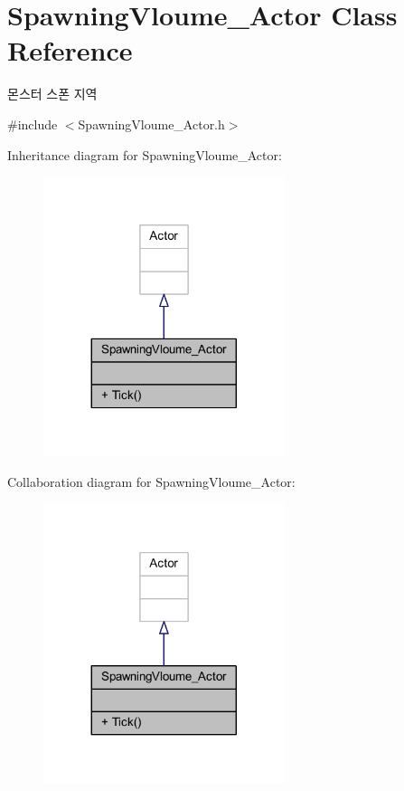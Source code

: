 \hypertarget{class_spawning_vloume___actor}{}\section{Spawning\+Vloume\+\_\+\+Actor Class Reference}
\label{class_spawning_vloume___actor}


몬스터 스폰 지역  




{\ttfamily \#include $<$Spawning\+Vloume\+\_\+\+Actor.\+h$>$}



Inheritance diagram for Spawning\+Vloume\+\_\+\+Actor\+:
\nopagebreak
\begin{figure}[H]
\begin{center}
\leavevmode
\includegraphics[width=200pt]{class_spawning_vloume___actor__inherit__graph}
\end{center}
\end{figure}


Collaboration diagram for Spawning\+Vloume\+\_\+\+Actor\+:
\nopagebreak
\begin{figure}[H]
\begin{center}
\leavevmode
\includegraphics[width=200pt]{class_spawning_vloume___actor__coll__graph}
\end{center}
\end{figure}
